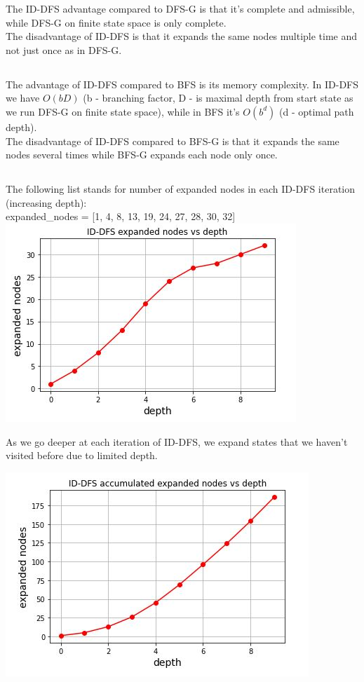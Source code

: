 \documentclass[12pt]{article}
\begin{document}
The ID-DFS advantage compared to DFS-G is that it's complete and admissible, while DFS-G on finite state space is only complete.\\
The disadvantage of ID-DFS is that it expands the same nodes multiple time and not just once as in DFS-G.

\subsection{}

The advantage of ID-DFS compared to BFS is its memory complexity. In ID-DFS we have $O(bD)$ (b - branching factor, D - is maximal depth from start state as we run DFS-G on finite state space), while in BFS it's $O(b^d)$ (d - optimal path depth).\\
The disadvantage of ID-DFS compared to BFS-G is that it expands the same nodes several times while BFS-G expands each node only once.

\subsection{}

The following list stands for number of expanded nodes in each ID-DFS iteration (increasing depth):\\
expanded\_nodes = [1, 4, 8, 13, 19, 24, 27, 28, 30, 32]\\

\includegraphics[scale=1]{id_dfs_plot2.JPG}

As we go deeper at each iteration of ID-DFS, we expand states that we haven't visited before due to limited depth.

\includegraphics[scale=1]{id_dfs_plot.JPG}
\end{document}
